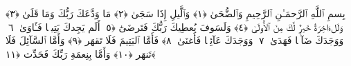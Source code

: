 
  
    
  
    
    

\nopagebreak
  بِسمِ ٱللَّهِ ٱلرَّحمَـٰنِ ٱلرَّحِيمِ
  وَٱلضُّحَىٰ ﴿١﴾
 وَٱلَّيلِ إِذَا سَجَىٰ ﴿٢﴾
 مَا وَدَّعَكَ رَبُّكَ وَمَا قَلَىٰ ﴿٣﴾
 وَلَلءَاخِرَةُ خَيرٌۭ لَّكَ مِنَ ٱلأُولَىٰ ﴿٤﴾
 وَلَسَوفَ يُعطِيكَ رَبُّكَ فَتَرضَىٰٓ ﴿٥﴾
 أَلَم يَجِدكَ يَتِيمًۭا فَـَٔاوَىٰ ﴿٦﴾
 وَوَجَدَكَ ضَآلًّۭا فَهَدَىٰ ﴿٧﴾
 وَوَجَدَكَ عَآئِلًۭا فَأَغنَىٰ ﴿٨﴾
 فَأَمَّا ٱليَتِيمَ فَلَا تَقهَر ﴿٩﴾
 وَأَمَّا ٱلسَّآئِلَ فَلَا تَنهَر ﴿١٠﴾
 وَأَمَّا بِنِعمَةِ رَبِّكَ فَحَدِّث ﴿١١﴾
 
